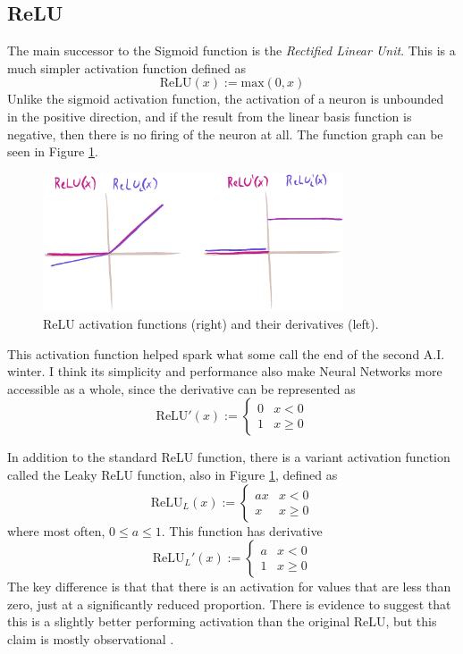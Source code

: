 \documentclass[12pt]{report}
\begin{document}
\subsection{ReLU}
The main successor to the Sigmoid function is the \emph{Rectified Linear Unit}. This is a much simpler activation function defined as
$$\text{ReLU}(x) := \text{max}(0,x)$$
Unlike the sigmoid activation function, the activation of a neuron is unbounded in the positive direction, and if the result from the linear basis function is negative, then there is no firing of the neuron at all. The function graph can be seen in Figure \ref{relu}.
\begin{figure}[hbt!]
    \centering
    \includegraphics[width=3.5in]{figures/relu.PNG}
    \caption{ReLU activation functions (right) and their derivatives (left).}
    \label{relu}
\end{figure}
This activation function helped spark what some call the end of the second A.I. winter. I think its simplicity and performance also make Neural Networks more accessible as a whole, since the derivative can be represented as
$$\text{ReLU}'(x) :=
\begin{cases} 
0 & x < 0 \\
1 & x \geq 0
\end{cases}$$

In addition to the standard ReLU function, there is a variant activation function called the Leaky ReLU function, also in Figure \ref{relu}, defined as
$$\text{ReLU}_L(x) :=
\begin{cases} 
ax & x < 0 \\
x & x \geq 0
\end{cases}$$
where most often, $0 \leq a \leq 1$.
This function has derivative
$$\text{ReLU}_L'(x) :=
\begin{cases} 
a & x < 0 \\
1 & x \geq 0
\end{cases}$$
The key difference is that that there is an activation for values that are less than zero, just at a significantly reduced proportion. There is evidence to suggest that this is a slightly better performing activation than the original ReLU, but this claim is mostly observational \cite{xu2015empirical}.
\end{document}
